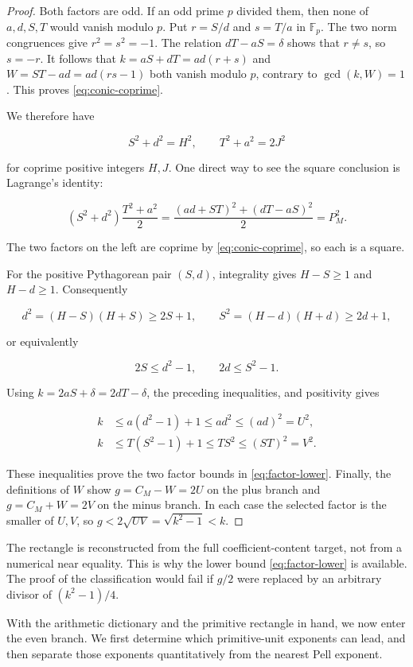 \begin{proof}
Both factors are odd. If an odd prime $p$ divided them, then none of
$a,d,S,T$ would vanish modulo $p$. Put
$r=S/d$ and $s=T/a$ in $\mathbb{F}_p$. The two norm congruences give
$r^2=s^2=-1$. The relation $dT-aS=\delta$ shows that $r\ne s$, so
$s=-r$. It follows that
$k=aS+dT=ad(r+s)$ and $W=ST-ad=ad(rs-1)$ both vanish modulo $p$, contrary
to $\gcd(k,W)=1$. This proves \cref{eq:conic-coprime}.

We therefore have

\begin{equation}
 S^2+d^2=H^2,
 \qquad
 T^2+a^2=2J^2
 \label{eq:two-conics}
\end{equation}

for coprime positive integers $H,J$. One direct way to see the square
conclusion is Lagrange's identity:

\begin{equation}
 (S^2+d^2)\frac{T^2+a^2}{2}
 =\frac{(ad+ST)^2+(dT-aS)^2}{2}
 =P_M^2.
\end{equation}

The two factors on the left are coprime by \cref{eq:conic-coprime}, so each
is a square.

For the positive Pythagorean pair $(S,d)$, integrality gives
$H-S\geqslant1$ and $H-d\geqslant1$. Consequently

\begin{equation}
 d^2=(H-S)(H+S)\geqslant2S+1,
 \qquad
 S^2=(H-d)(H+d)\geqslant2d+1,
\end{equation}

or equivalently

\begin{equation}
 2S\leqslant d^2-1,
 \qquad
 2d\leqslant S^2-1.
\end{equation}

Using $k=2aS+\delta=2dT-\delta$, the preceding inequalities, and
positivity gives

\begin{align}
 k
 &\leqslant a(d^2-1)+1
 \leqslant ad^2
 \leqslant(ad)^2=U^2,
 \label{eq:U-lower}\\
 k
 &\leqslant T(S^2-1)+1
 \leqslant TS^2
 \leqslant(ST)^2=V^2.
 \label{eq:V-lower}
\end{align}

These inequalities prove the two factor bounds in
\cref{eq:factor-lower}. Finally, the
definitions of $W$ show $g=C_M-W=2U$ on the plus branch and
$g=C_M+W=2V$ on the minus branch. In each case the selected factor is the
smaller of $U,V$, so
$g<2\sqrt{UV}=\sqrt{k^2-1}<k$.
\end{proof}

\begin{remark}
The rectangle is reconstructed from the full coefficient-content target,
not from a numerical near equality. This is why the lower bound
\cref{eq:factor-lower} is available. The proof of the classification would
fail if $g/2$ were replaced by an arbitrary divisor of
$(k^2-1)/4$.
\end{remark}

With the arithmetic dictionary and the primitive rectangle in hand, we now
enter the even branch. We first determine which primitive-unit exponents can
lead, and then separate those exponents quantitatively from the nearest Pell
exponent.

